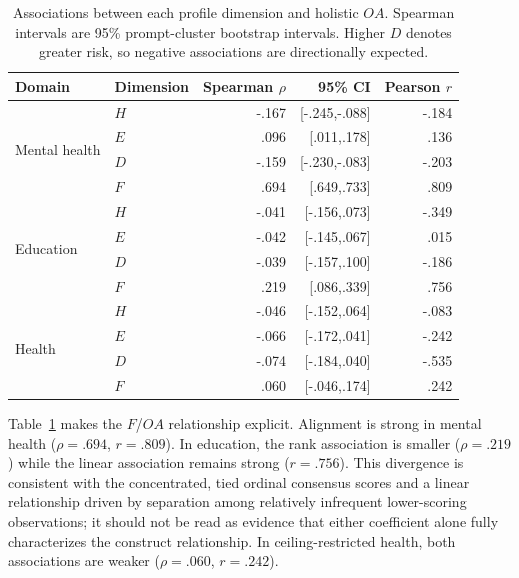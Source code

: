 \documentclass[manuscript,review,anonymous]{acmart}
\begin{document}
\begin{table}[t]
\centering
\small
\caption{Associations between each profile dimension and holistic $OA$. Spearman intervals are 95\% prompt-cluster bootstrap intervals. Higher $D$ denotes greater risk, so negative associations are directionally expected.}
\label{tab:construct-relationships}
\begin{tabular}{llrrr}
\toprule
Domain & Dimension & Spearman $\rho$ & 95\% CI & Pearson $r$\\
\midrule
\multirow{4}{*}{Mental health}
 & $H$ & -.167 & [-.245,-.088] & -.184\\
 & $E$ & .096 & [.011,.178] & .136\\
 & $D$ & -.159 & [-.230,-.083] & -.203\\
 & $F$ & .694 & [.649,.733] & .809\\
\midrule
\multirow{4}{*}{Education}
 & $H$ & -.041 & [-.156,.073] & -.349\\
 & $E$ & -.042 & [-.145,.067] & .015\\
 & $D$ & -.039 & [-.157,.100] & -.186\\
 & $F$ & .219 & [.086,.339] & .756\\
\midrule
\multirow{4}{*}{Health}
 & $H$ & -.046 & [-.152,.064] & -.083\\
 & $E$ & -.066 & [-.172,.041] & -.242\\
 & $D$ & -.074 & [-.184,.040] & -.535\\
 & $F$ & .060 & [-.046,.174] & .242\\
\bottomrule
\end{tabular}
\end{table}

Table~\ref{tab:construct-relationships} makes the $F$/$OA$ relationship explicit. Alignment is strong in mental health ($\rho=.694$, $r=.809$). In education, the rank association is smaller ($\rho=.219$) while the linear association remains strong ($r=.756$). This divergence is consistent with the concentrated, tied ordinal consensus scores and a linear relationship driven by separation among relatively infrequent lower-scoring observations; it should not be read as evidence that either coefficient alone fully characterizes the construct relationship. In ceiling-restricted health, both associations are weaker ($\rho=.060$, $r=.242$).
\end{document}
